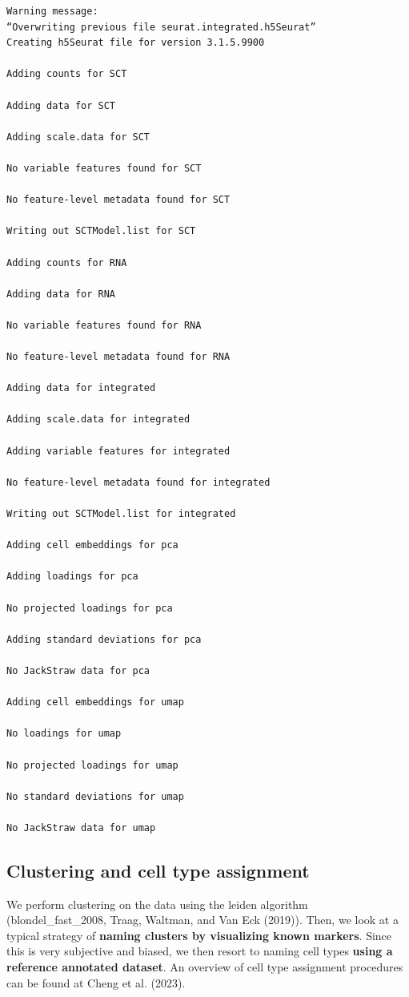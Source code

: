 \documentclass[
  letterpaper,
  DIV=11,
  numbers=noendperiod]{scrartcl}
\begin{document}
\begin{verbatim}
Warning message:
“Overwriting previous file seurat.integrated.h5Seurat”
Creating h5Seurat file for version 3.1.5.9900

Adding counts for SCT

Adding data for SCT

Adding scale.data for SCT

No variable features found for SCT

No feature-level metadata found for SCT

Writing out SCTModel.list for SCT

Adding counts for RNA

Adding data for RNA

No variable features found for RNA

No feature-level metadata found for RNA

Adding data for integrated

Adding scale.data for integrated

Adding variable features for integrated

No feature-level metadata found for integrated

Writing out SCTModel.list for integrated

Adding cell embeddings for pca

Adding loadings for pca

No projected loadings for pca

Adding standard deviations for pca

No JackStraw data for pca

Adding cell embeddings for umap

No loadings for umap

No projected loadings for umap

No standard deviations for umap

No JackStraw data for umap
\end{verbatim}

\subsection{Clustering and cell type
assignment}\label{clustering-and-cell-type-assignment}

We perform clustering on the data using the leiden algorithm
(blondel\_fast\_2008, Traag, Waltman, and Van Eck (2019)). Then, we look
at a typical strategy of \textbf{naming clusters by visualizing known
markers}. Since this is very subjective and biased, we then resort to
naming cell types \textbf{using a reference annotated dataset}. An
overview of cell type assignment procedures can be found at Cheng et al.
(2023).
\end{document}
